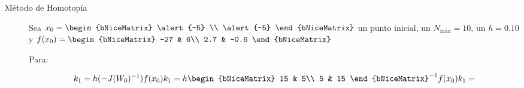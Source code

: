 \begin{frame}
	\begin{solution}
		\begin{description}
			\item[Método de Homotopía]
                    Sea
				\begin{math}
					x_{0}=
					\begin{bNiceMatrix}
						\alert{-5} \\
						\alert{-5}
					\end{bNiceMatrix}
				\end{math}
				un punto inicial, un
				$N_{\text{máx}}=10$, un $h=0.10$ y 
                    \begin{math}
                        f(x_0)=
                        \begin{bNiceMatrix}
                            -27 & 6\\
                            2.7 & -0.6
                        \end{bNiceMatrix}
                    \end{math}

                Para:
                
                \begin{equation*}
                    k_1=h(-J(W_0)^{-1})f(x_0)
                    
                    k_1=h
                    \begin{bNiceMatrix}
                            15 & 5\\
                            5 & 15
                            \end{bNiceMatrix}^{-1}f(x_0)
                    k_1=
                \end{equation*}

                

				\end{description}
	\end{solution}
 \end{frame}